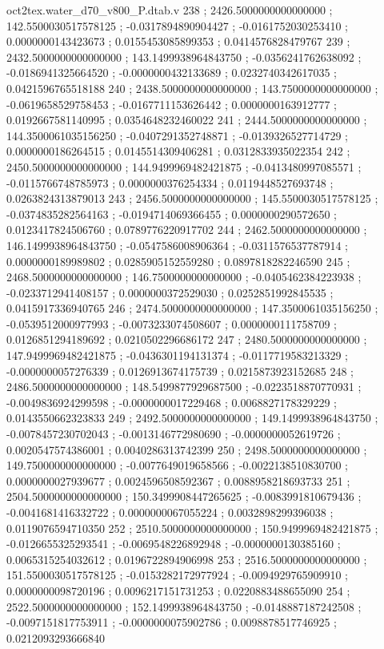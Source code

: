 \begin{filecontents}[overwrite]{oct2tex.water_d70_v800_P.dtab.v}
238 ; 2426.5000000000000000 ; 142.5500030517578125 ; -0.0317894890904427 ; -0.0161752030253410 ; 0.0000000143423673 ; 0.0155453085899353 ; 0.0414576828479767
239 ; 2432.5000000000000000 ; 143.1499938964843750 ; -0.0356241762638092 ; -0.0186941325664520 ; -0.0000000432133689 ; 0.0232740342617035 ; 0.0421596765518188
240 ; 2438.5000000000000000 ; 143.7500000000000000 ; -0.0619658529758453 ; -0.0167711153626442 ; 0.0000000163912777 ; 0.0192667581140995 ; 0.0354648232460022
241 ; 2444.5000000000000000 ; 144.3500061035156250 ; -0.0407291352748871 ; -0.0139326527714729 ; 0.0000000186264515 ; 0.0145514309406281 ; 0.0312833935022354
242 ; 2450.5000000000000000 ; 144.9499969482421875 ; -0.0413480997085571 ; -0.0115766748785973 ; 0.0000000376254334 ; 0.0119448527693748 ; 0.0263824313879013
243 ; 2456.5000000000000000 ; 145.5500030517578125 ; -0.0374835282564163 ; -0.0194714069366455 ; 0.0000000290572650 ; 0.0123417824506760 ; 0.0789776220917702
244 ; 2462.5000000000000000 ; 146.1499938964843750 ; -0.0547586008906364 ; -0.0311576537787914 ; 0.0000000189989802 ; 0.0285905152559280 ; 0.0897818282246590
245 ; 2468.5000000000000000 ; 146.7500000000000000 ; -0.0405462384223938 ; -0.0233712941408157 ; 0.0000000372529030 ; 0.0252851992845535 ; 0.0415917336940765
246 ; 2474.5000000000000000 ; 147.3500061035156250 ; -0.0539512000977993 ; -0.0073233074508607 ; 0.0000000111758709 ; 0.0126851294189692 ; 0.0210502296686172
247 ; 2480.5000000000000000 ; 147.9499969482421875 ; -0.0436301194131374 ; -0.0117719583213329 ; -0.0000000057276339 ; 0.0126913674175739 ; 0.0215873923152685
248 ; 2486.5000000000000000 ; 148.5499877929687500 ; -0.0223518870770931 ; -0.0049836924299598 ; -0.0000000017229468 ; 0.0068827178329229 ; 0.0143550662323833
249 ; 2492.5000000000000000 ; 149.1499938964843750 ; -0.0078457230702043 ; -0.0013146772980690 ; -0.0000000052619726 ; 0.0020547574386001 ; 0.0040286313742399
250 ; 2498.5000000000000000 ; 149.7500000000000000 ; -0.0077649019658566 ; -0.0022138510830700 ; 0.0000000027939677 ; 0.0024596508592367 ; 0.0088958218693733
251 ; 2504.5000000000000000 ; 150.3499908447265625 ; -0.0083991810679436 ; -0.0041681416332722 ; 0.0000000067055224 ; 0.0032898299396038 ; 0.0119076594710350
252 ; 2510.5000000000000000 ; 150.9499969482421875 ; -0.0126655325293541 ; -0.0069548226892948 ; -0.0000000130385160 ; 0.0065315254032612 ; 0.0196722894906998
253 ; 2516.5000000000000000 ; 151.5500030517578125 ; -0.0153282172977924 ; -0.0094929765909910 ; 0.0000000098720196 ; 0.0096217151731253 ; 0.0220883488655090
254 ; 2522.5000000000000000 ; 152.1499938964843750 ; -0.0148887187242508 ; -0.0097151817753911 ; -0.0000000075902786 ; 0.0098878517746925 ; 0.0212093293666840

\end{filecontents}
